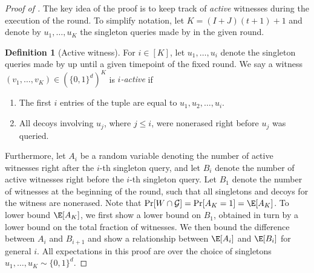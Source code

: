 \documentclass[11pt]{article}
\numberwithin{equation}{section}
\theoremstyle{definition}
\newtheorem{definition}[theorem]{Definition}
\theoremstyle{plain}
\begin{document}
\begin{proof}[Proof of ]
    
The key idea of the proof is to keep track of \emph{active} witnesses during the execution of the round. To simplify notation, let $K = (I + J)(t+1) + 1$ and denote by $u_1, \dots, u_{K}$ the singleton queries made by  in the given round.  

\begin{definition}[Active witness] For $i \in [K]$, let $u_1, \dots, u_i$ denote the singleton queries made by  %
up until
a given timepoint of the fixed round. We say a witness $(v_1,\dots, v_{K}) \in (\{0,1\}^d)^{K}$ is  {\em $i$-active} if
\begin{enumerate}
    \item The first $i$ entries of the tuple are equal to $u_1, u_2, \dots, u_i$.
    \item All decoys involving $u_j$, where $j \leq i$, were nonerased right before $u_j$ was queried. 
\end{enumerate}
 
\end{definition}

Furthermore, let $A_i$ be a random variable denoting the number of active witnesses right after the $i$-th singleton query, and let $B_i$ denote the number of active witnesses right before the $i$-th singleton query. Let $B_1$ denote the number of witnesses at the beginning of the round, such that all singletons and decoys for the witness are nonerased. Note that $\Pr[W \cap \mathcal{G}] = \Pr[A_{K} = 1] = \E[A_{K}]$. To lower bound $\E[A_{K}]$, we first show a lower bound on $B_1$, obtained in turn by a lower bound on the total fraction of witnesses. We then bound the difference between $A_i$ and $B_{i+1}$ and show a relationship between $\E[A_i]$ and $\E[B_i]$ for general $i$. All expectations in this proof are over the choice of singletons $u_1, \dots, u_K \sim \{0,1\}^d$. 


\end{proof}
\end{document}
